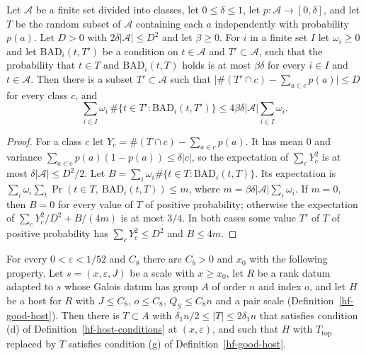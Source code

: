 \begin{lemma}\label{hf-random-selection}
Let $\mathcal A$ be a finite set divided into classes, let $0\leq\delta\leq1$, let
$p\colon\mathcal A\to[0,\delta]$, and let $T$ be the random subset of $\mathcal A$ containing each
$a$ independently with probability $p(a)$. Let $D>0$ with $2\delta|\mathcal A|\leq D^2$ and let
$\beta\geq0$. For $i$ in a finite set $I$ let $\omega_i\geq0$ and let $\mathrm{BAD}_i(t,T')$ be a
condition on $t\in\mathcal A$ and $T'\subset\mathcal A$, such that the probability that $t\in T$
and $\mathrm{BAD}_i(t,T)$ holds is at most $\beta\delta$ for every $i\in I$ and $t\in\mathcal A$.
Then there is a subset $T'\subset\mathcal A$ such that
$\bigl|\#(T'\cap c)-\sum_{a\in c}p(a)\bigr|\leq D$ for every class $c$, and
\[
 \sum_{i\in I}\omega_i\,\#\{t\in T':\mathrm{BAD}_i(t,T')\}\leq4\beta\delta|\mathcal A|\sum_{i\in I}\omega_i.
\]
\end{lemma}

\begin{proof}
For a class $c$ let $Y_c=\#(T\cap c)-\sum_{a\in c}p(a)$. It has mean $0$ and variance
$\sum_{a\in c}p(a)(1-p(a))\leq\delta|c|$, so the expectation of $\sum_cY_c^2$ is at most
$\delta|\mathcal A|\leq D^2/2$. Let $B=\sum_i\omega_i\#\{t\in T:\mathrm{BAD}_i(t,T)\}$. Its expectation
is $\sum_i\omega_i\sum_t\Pr(t\in T,\ \mathrm{BAD}_i(t,T))\leq m$, where
$m=\beta\delta|\mathcal A|\sum_i\omega_i$. If $m=0$, then $B=0$ for every value of $T$ of positive
probability; otherwise the expectation of $\sum_cY_c^2/D^2+B/(4m)$ is at most $3/4$. In both cases
some value $T'$ of $T$ of positive probability has $\sum_cY_c^2\leq D^2$ and $B\leq4m$.
\end{proof}

\begin{lemma}\label{hf-top-classes}
For every $0<\varepsilon<1/52$ and $C_8$ there are $C_b>0$ and $x_0$ with the following property.
Let $s=(x,\varepsilon,J)$ be a scale with $x\geq x_0$, let $R$ be a rank datum adapted to $s$ whose Galois datum
has group $A$ of order $n$ and index $o$, and let $H$ be a host for $R$ with $J\leq C_8$, $o\leq C_8$,
$Q_S\leq C_8n$ and a pair scale (Definition~\ref{hf-good-host}). Then there is $T\subset A$ with
$\delta_1n/2\leq|T|\leq2\delta_1n$ that satisfies condition (d) of
Definition~\ref{hf-host-conditions} at $(x,\varepsilon)$, and such that $H$ with $T_{\mathrm{top}}$
replaced by $T$ satisfies condition (g) of Definition~\ref{hf-good-host}.
\end{lemma}

